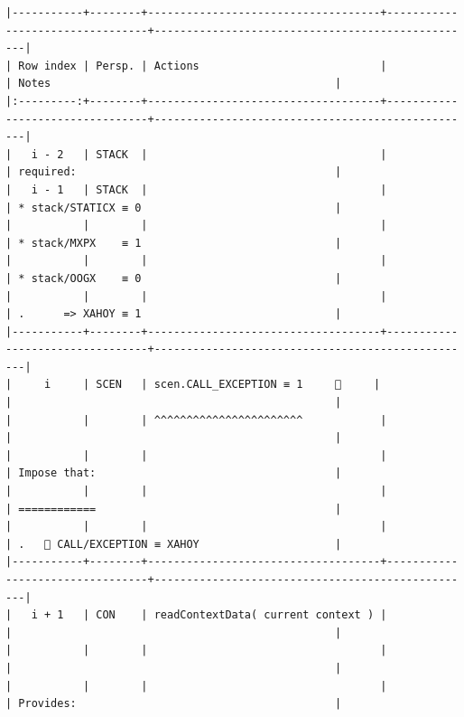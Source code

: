 \documentclass[varwidth=\maxdimen,margin=0.5cm,multi={verbatim}]{standalone}
\begin{document}
\begin{verbatim}
|-----------+--------+------------------------------------+---------------------------------+--------------------------------------------------|
| Row index | Persp. | Actions                            |                                 | Notes                                            |
|:---------:+--------+------------------------------------+---------------------------------+--------------------------------------------------|
|   i - 2   | STACK  |                                    |                                 | required:                                        |
|   i - 1   | STACK  |                                    |                                 | * stack/STATICX ≡ 0                              |
|           |        |                                    |                                 | * stack/MXPX    ≡ 1                              |
|           |        |                                    |                                 | * stack/OOGX    ≡ 0                              |
|           |        |                                    |                                 | .      => XAHOY ≡ 1                              |
|-----------+--------+------------------------------------+---------------------------------+--------------------------------------------------|
|     i     | SCEN   | scen.CALL_EXCEPTION ≡ 1     👋     |                                 |                                                  |
|           |        | ^^^^^^^^^^^^^^^^^^^^^^^            |                                 |                                                  |
|           |        |                                    |                                 | Impose that:                                     |
|           |        |                                    |                                 | ============                                     |
|           |        |                                    |                                 | .    CALL/EXCEPTION ≡ XAHOY                     |
|-----------+--------+------------------------------------+---------------------------------+--------------------------------------------------|
|   i + 1   | CON    | readContextData( current context ) |                                 |                                                  |
|           |        |                                    |                                 |                                                  |
|           |        |                                    |                                 | Provides:                                        |

\end{verbatim}
\end{document}
